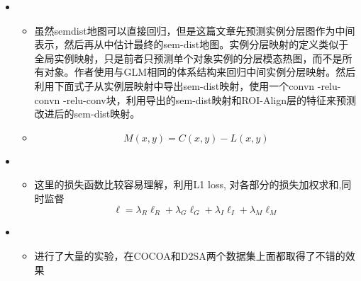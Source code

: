 \begin{itemize}[leftmargin=*]
{\begin{itemize}
    \end{itemize}
    }
    \item {}
	{\small
	\begin{itemize}
		\item 虽然semdist地图可以直接回归，但是这篇文章先预测实例分层图作为中间表示，然后再从中估计最终的sem-dist地图。实例分层映射的定义类似于全局实例映射，只是前者只预测单个对象实例的分层模态热图，而不是所有对象。作者使用与GLM相同的体系结构来回归中间实例分层映射。然后利用下面式子从实例层映射中导出sem-dist映射，使用一个convn -relu- convn -relu-conv块，利用导出的sem-dist映射和ROI-Align层的特征来预测改进后的sem-dist映射。
		\item \begin{equation}M(x, y)=C(x, y)-L(x, y)\end{equation}
		
	\end{itemize}
	}
    \item {}
	{\small
	\begin{itemize}
	\item 这里的损失函数比较容易理解，利用L1 loss, 对各部分的损失加权求和,同时监督
	\begin{equation}\ell=\lambda_{R} \ell_{R}+\lambda_{G} \ell_{G}+\lambda_{I} \ell_{I}+\lambda_{M} \ell_{M}\end{equation}
	\end{itemize}
	}
	 \item {}
	{\small
		\begin{itemize}
			\item 进行了大量的实验，在COCOA和D2SA两个数据集上面都取得了不错的效果
		\end{itemize}
	}

  \end{itemize}